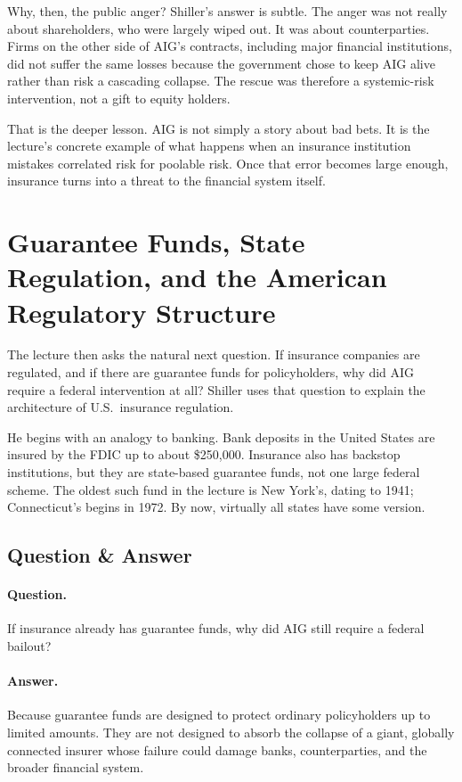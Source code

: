 Why, then, the public anger? Shiller's answer is subtle. The anger was not really about shareholders, who were largely wiped out. It was about counterparties. Firms on the other side of AIG's contracts, including major financial institutions, did not suffer the same losses because the government chose to keep AIG alive rather than risk a cascading collapse. The rescue was therefore a systemic-risk intervention, not a gift to equity holders.

That is the deeper lesson. AIG is not simply a story about bad bets. It is the lecture's concrete example of what happens when an insurance institution mistakes correlated risk for poolable risk. Once that error becomes large enough, insurance turns into a threat to the financial system itself.

\section{Guarantee Funds, State Regulation, and the American Regulatory Structure}

The lecture then asks the natural next question. If insurance companies are regulated, and if there are guarantee funds for policyholders, why did AIG require a federal intervention at all? Shiller uses that question to explain the architecture of U.S.\ insurance regulation.

He begins with an analogy to banking. Bank deposits in the United States are insured by the FDIC up to about \$250{,}000. Insurance also has backstop institutions, but they are state-based guarantee funds, not one large federal scheme. The oldest such fund in the lecture is New York's, dating to 1941; Connecticut's begins in 1972. By now, virtually all states have some version.

\subsection{Question \& Answer}

\paragraph{Question.} If insurance already has guarantee funds, why did AIG still require a federal bailout?

\paragraph{Answer.} Because guarantee funds are designed to protect ordinary policyholders up to limited amounts. They are not designed to absorb the collapse of a giant, globally connected insurer whose failure could damage banks, counterparties, and the broader financial system.

